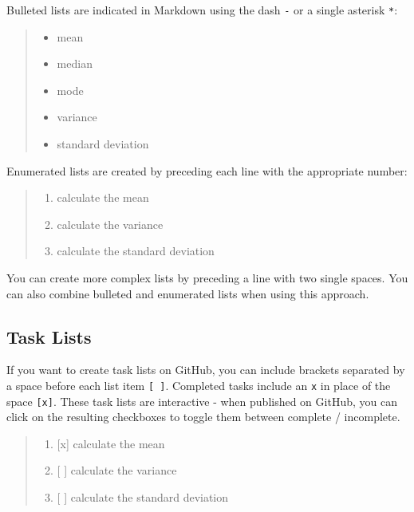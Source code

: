 \documentclass[]{book}
\providecommand{\tightlist}{%
  \setlength{\itemsep}{0pt}\setlength{\parskip}{0pt}}
\theoremstyle{definition}
\theoremstyle{definition}
\theoremstyle{definition}
\theoremstyle{remark}
\begin{document}
Bulleted lists are indicated in Markdown using the dash \texttt{-} or a
single asterisk \texttt{*}:

\begin{quote}
\begin{itemize}
\tightlist
\item
  mean
\item
  median
\item
  mode
\item
  variance
\item
  standard deviation
\end{itemize}
\end{quote}

Enumerated lists are created by preceding each line with the appropriate
number:

\begin{quote}
\begin{enumerate}
\def\labelenumi{\arabic{enumi}.}
\tightlist
\item
  calculate the mean
\item
  calculate the variance
\item
  calculate the standard deviation
\end{enumerate}
\end{quote}

You can create more complex lists by preceding a line with two single
spaces. You can also combine bulleted and enumerated lists when using
this approach.

\subsection{Task Lists}\label{task-lists}

If you want to create task lists on GitHub, you can include brackets
separated by a space before each list item \texttt{{[}\ {]}}. Completed
tasks include an \texttt{x} in place of the space \texttt{{[}x{]}}.
These task lists are interactive - when published on GitHub, you can
click on the resulting checkboxes to toggle them between complete /
incomplete.

\begin{quote}
\begin{enumerate}
\def\labelenumi{\arabic{enumi}.}
\tightlist
\item
  {[}x{]} calculate the mean
\item
  {[} {]} calculate the variance
\item
  {[} {]} calculate the standard deviation
\end{enumerate}
\end{quote}
\end{document}
